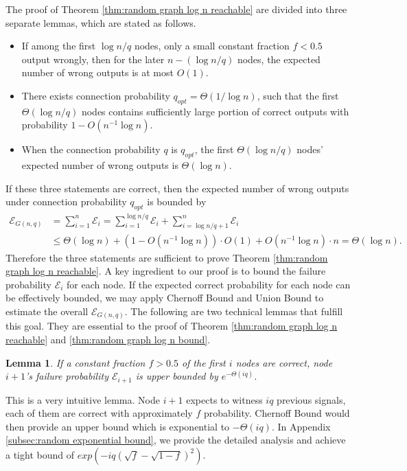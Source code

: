 \documentclass[a4paper,UKenglish]{lipics}
\newtheorem{lem}[thm]{Lemma}
\theoremstyle{definition}
\begin{document}
The proof of Theorem \ref{thm:random graph log n reachable} are divided into three separate lemmas, which are stated as follows.
\begin{itemize}
\item If among the first $\log n/q$ nodes, 
		only a small constant fraction $f < 0.5$ output wrongly, 
		then for the later $n - (\log n/q)$ nodes, the expected number of wrong outputs is at most $O(1)$.
\item There exists connection probability $q_{opt} = \Theta(1/\log n)$, such that the first $\Theta(\log n/q)$ nodes 
		contains sufficiently large portion of correct outputs with probability $1 - O(n^{-1}\log n)$.
\item When the connection probability $q$ is $q_{opt}$, the first $\Theta(\log n/q)$ nodes' expected number of wrong outputs is $\Theta(\log n)$.
\end{itemize}
If these three statements are correct, then the expected number of wrong outputs under connection probability $q_{opt}$ is bounded by
\begin{equation}
\begin{aligned}
\label{equ:bound2}
	\mathcal{E}_{G(n,q)}
& =
	\sum_{i=1}^{n}	\mathcal{E}_i
	=
	\sum_{i=1}^{\log n/q}	\mathcal{E}_i + \sum_{i=\log n/q + 1}^{n}	\mathcal{E}_i
\\
& \le
	\Theta(\log n) + (1 - O(n^{-1}\log n))\cdot O(1) + O(n^{-1}\log n)\cdot n
	=
	\Theta(\log n).
\end{aligned}
\end{equation}
Therefore the three statements are sufficient to prove Theorem \ref{thm:random graph log n reachable}.
A key ingredient to our proof is to bound the failure probability $\mathcal{E}_i$ for each node.
If the expected correct probability for each node can be effectively bounded, 
	we may apply Chernoff Bound and Union Bound to estimate the overall $\mathcal{E}_{G(n,q)}$.
The following are two technical lemmas that fulfill this goal.
They are essential to the proof of Theorem \ref{thm:random graph log n reachable} and \ref{thm:random graph log n bound}.

\begin{lem} 
\label {lem:random exponential bound}
If a constant fraction $f > 0.5$ of the first $i$ nodes are correct, 
	node $i+1$'s failure probability $\mathcal{E}_{i+1}$ is upper bounded by $e^{-\Theta(iq)}$. 
\end{lem}

This is a very intuitive lemma.
Node $i+1$ expects to witness $iq$ previous signals, each of them are correct with approximately $f$ probability.
Chernoff Bound would then provide an upper bound which is exponential to $-\Theta(iq)$.
In Appendix \ref{subsec:random exponential bound}, we provide the detailed analysis
	and achieve a tight bound of $exp({-iq(\sqrt{f} - \sqrt{1-f})^2})$.
\end{document}

